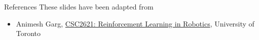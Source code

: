 \begin{frame}{References}
These slides have been adapted from
\begin{itemize}
    \item Animesh Garg, \href{https://animesh.garg.tech/CSC2621-W20/}{CSC2621: Reinforcement Learning in Robotics}, University of Toronto
\end{itemize}
\end{frame}
